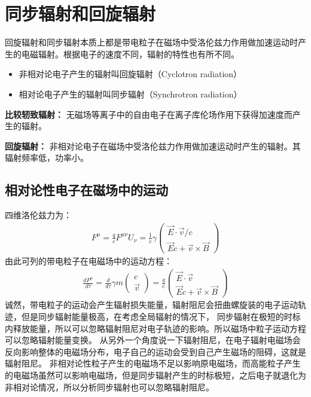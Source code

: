 \section{同步辐射和回旋辐射}


回旋辐射和同步辐射本质上都是带电粒子在磁场中受洛伦兹力作用做加速运动时产生的电磁辐射。根据电子的速度不同，辐射的特性也有所不同。
\begin{itemize}
  \item 非相对论电子产生的辐射叫回旋辐射（Cyclotron radiation）
  \item 相对论电子产生的辐射叫同步辐射（Synchrotron radiation）
\end{itemize}

\textbf{比较轫致辐射：} 无磁场等离子中的自由电子在离子库伦场作用下获得加速度而产生的辐射。

\begin{definition}
  \textbf{回旋辐射：} 非相对论电子在磁场中受洛伦兹力作用做加速运动时产生的辐射。其辐射频率低，功率小。
\end{definition}

\subsection{相对论性电子在磁场中的运动}
四维洛伦兹力为：
\begin{align}
  F^\mu = \frac{q}{c}F^{\mu\nu}U_\nu = \frac{1}{c}\gamma
  \begin{pmatrix}
    \vec{E}\cdot\vec{v}/c \\
    \vec{E}c + \vec{v}\times\vec{B}
  \end{pmatrix}
\end{align}
由此可列的带电粒子在电磁场中的运动方程：
\begin{align}
  \frac{dP^{\mu}}{d\tau} = \frac{d}{d\tau} \gamma m 
  \begin{pmatrix}
    c \\
    \vec{v}
  \end{pmatrix} = 
  \frac{q}{c}
  \begin{pmatrix}
    \vec{E} \cdot \vec{v} \\
    \vec{E}c + \vec{v} \times \vec{B}
  \end{pmatrix}
\end{align}
诚然，带电粒子的运动会产生辐射损失能量，辐射阻尼会扭曲螺旋装的电子运动轨迹，但是同步辐射能量极高，在考虑全局辐射的情况下，
同步辐射在极短的时标内释放能量，所以可以忽略辐射阻尼对电子轨迹的影响。所以磁场中粒子运动方程可以忽略辐射能量变换。
从另外一个角度说一下辐射阻尼，在电子辐射电磁场会反向影响整体的电磁场分布，电子自己的运动会受到自己产生磁场的阻碍，这就是辐射阻尼。
非相对论性粒子产生的电磁场不足以影响原电磁场，而高能粒子产生的电磁场虽然可以影响电磁场，但是同步辐射产生的时标极短，之后电子就退化为非相对论情况，所以分析同步辐射也可以忽略辐射阻尼。

